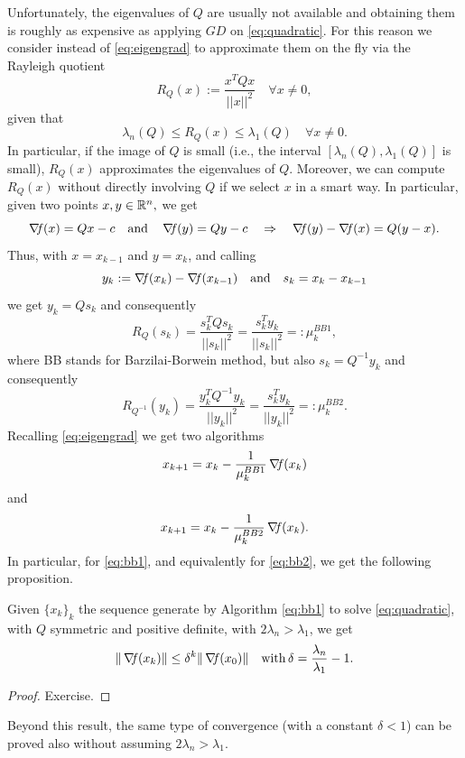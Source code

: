 \documentclass[10pt,a4paper]{article}
\begin{document}
Unfortunately, the eigenvalues of $Q$ are usually not available and obtaining them is roughly as expensive as applying $GD$ on \eqref{eq:quadratic}. For this reason we consider instead of \eqref{eq:eigengrad} to approximate them on the fly via the Rayleigh quotient
\begin{equation*}
	R_Q(x) := \frac{x^TQx}{||x||^2} \quad \forall x\neq 0,
\end{equation*}
given that 
\begin{equation*}
	\lambda_n(Q) \leq R_Q(x) \leq \lambda_1(Q) \quad \forall x\neq 0. 
\end{equation*}
In particular, if the image of $Q$ is small (i.e., the interval $[\lambda_n(Q),\lambda_1(Q)]$ is small), $R_Q(x)$ approximates the eigenvalues of $Q$. Moreover, we can compute $R_Q(x)$ without directly involving $Q$ if we select $x$ in a smart way. In particular, given two points $x,y\in\mathbb{R}^n,$ we get 
\begin{equation*}
	\operatorname*{\mathit{\nabla \!f}}(x) = Qx-c \quad \text{and}\quad \operatorname*{\mathit{\nabla \!f}}(y) = Qy-c \quad \Rightarrow \quad \operatorname*{\mathit{\nabla \!f}}(y) - \operatorname*{\mathit{\nabla \!f}}(x) = Q(y-x).
\end{equation*} 
Thus, with $x=x_{k-1}$ and $y=x_k$, and calling 
\begin{equation*}
	y_k:= \operatorname*{\mathit{\nabla \!f}}(x_k) - \operatorname*{\mathit{\nabla \!f}}(x_{k-1})  \quad \text{and} \quad s_k= x_k -x_{k-1}
\end{equation*}
we get $y_k = Qs_k$ and consequently
\begin{equation}\label{eq:railey_bb1}
	R_Q(s_k) = \frac{s_k^TQs_k}{||s_k||^2} =  \frac{s_k^Ty_k}{||s_k||^2}=: \mu_k^{BB1},
\end{equation}
where BB stands for Barzilai-Borwein method, but also $s_k=Q^{-1}y_k$ and consequently
\begin{equation*}
	R_{Q^{-1}}(y_k) = \frac{y_k^TQ^{-1}y_k}{||y_k||^2} =  \frac{s_k^Ty_k}{||y_k||^2}=: \mu_k^{BB2}.
\end{equation*}
Recalling \eqref{eq:eigengrad} we get two algorithms
\begin{equation}\label{eq:bb1}
	x_{k+1} = x_k -\frac{1}{\mu_k^{BB1}} \operatorname*{\mathit{\nabla \!f}}(x_k) 
\end{equation}
and 
\begin{equation}\label{eq:bb2}
	x_{k+1} = x_k -\frac{1}{\mu_k^{BB2}} \operatorname*{\mathit{\nabla \!f}}(x_k).
\end{equation}
In particular, for \eqref{eq:bb1}, and equivalently for \eqref{eq:bb2}, we get the following proposition.
\begin{proposition}
	Given $\{x_k\}_k$ the sequence generate by Algorithm \eqref{eq:bb1} to solve \eqref{eq:quadratic}, with $Q$ symmetric and positive definite, with $2\lambda_n>\lambda_1$, we get 
	\begin{equation*}
		\| \operatorname*{\mathit{\nabla \!f}}(x_k)\|\leq \delta^k \|\operatorname*{\mathit{\nabla \!f}}(x_0)\| \quad \mathord{\mathrm{with }}\, \delta=\frac{\lambda_n}{\lambda_1}-1.
	\end{equation*}
\end{proposition}
\begin{proof}
Exercise.
\end{proof}
\noindent Beyond this result, the same type of convergence (with a constant $\delta<1$) can be proved also without assuming $2\lambda_n>\lambda_1$. %
\end{document}
